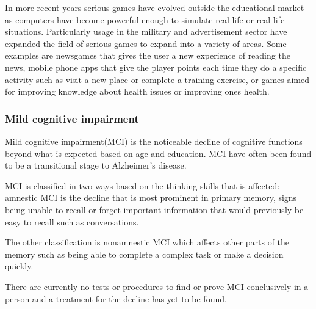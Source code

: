 In more recent years serious games have evolved outside the educational market as computers have become powerful enough to simulate real life or real life situations.
Particularly usage in the military and advertisement sector have expanded the field of serious games to expand into a variety of areas.
Some examples are newsgames that gives the user a new experience of reading the news, mobile phone apps that give the player points each time they do a specific activity
such as visit a new place or complete a training exercise, or games aimed for improving knowledge about health issues or improving ones health.

\subsubsection{Mild cognitive impairment}

Mild cognitive impairment(MCI) is the noticeable decline of cognitive functions beyond what is expected based on age and education.
MCI have often been found to be a transitional stage to Alzheimer's disease. \cite{alz:MCI}

MCI is classified in two ways based on the thinking skills that is affected:
amnestic MCI is the decline that is most prominent in primary memory, signs being unable to recall or forget important information that
would previously be easy to recall such as conversations.

The other classification is nonamnestic MCI which affects other parts of the memory such as being able to complete
a complex task or make a decision quickly.

There are currently no tests or procedures to find or prove MCI conclusively in a person and a treatment for the decline has yet to be found.
